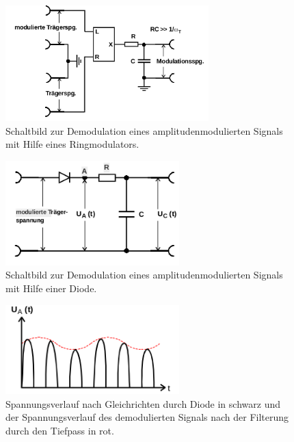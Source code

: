 \begin{figure}
\centering
\includegraphics[width=0.7\textwidth]{figures/demodulator.PNG}
\caption{Schaltbild zur Demodulation eines amplitudenmodulierten Signals mit Hilfe eines Ringmodulators.\cite{sample}}
\label{fig:7}
\end{figure}

\begin{figure}
  \centering
  \includegraphics[width=0.6\textwidth]{figures/gleichrichterdiode.PNG}
  \caption{Schaltbild zur Demodulation eines amplitudenmodulierten Signals mit Hilfe einer Diode.\cite{sample}}
  \label{fig:8}
\end{figure}

\begin{figure}
\centering
\includegraphics[width=0.6\textwidth]{figures/spannung_diode.PNG}
\caption{Spannungsverlauf nach Gleichrichten durch Diode in schwarz
und der Spannungsverlauf des demodulierten Signals nach der Filterung durch den Tiefpass in rot.\cite{sample}}
\label{fig:gleichgerichtet}
\end{figure}

